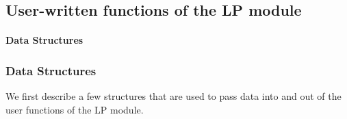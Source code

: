 \subsection{User-written functions of the LP module}
\label{user-written-lp}
\begin{latexonly}
\paragraph{Data Structures}
\end{latexonly}
\begin{htmlonly}
\subsubsection{Data Structures}
\end{htmlonly}
\noindent We first describe a few structures that are used to pass
data into and out of the user functions of the LP module.

